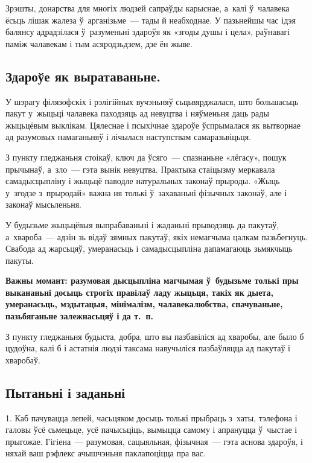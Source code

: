 
Зрэшты, донарства для многіх людзей сапраўды карыснае, а~калі ў~чалавека ёсьць лішак жалеза ў~арганізьме~--- тады й неабходнае. У пазьнейшы час ідэя балянсу адрадзілася ў~разуменьні здароўя як «згоды душы і цела», раўнавагі паміж чалавекам і тым асяродзьдзем, дзе ён жыве.

\subsection*{Здароўе як выратаваньне.} 

У шэрагу філязофскіх і рэлігійных вучэньняў сьцьвярджалася, што большасьць пакут у~жыцьці чалавека паходзяць ад невуцтва і няўменьня даць рады жыцьцёвым выклікам. Цялеснае і псыхічнае здароўе ўспрымалася як вытворнае ад разумовых намаганьняў і лічылася наступствам самаразьвіцьця.

З пункту гледжаньня стоікаў, ключ да ўсяго~--- спазнаньне «лёгасу», пошук прычынаў, а~зло~--- гэта вынік невуцтва. Практыка стаіцызму меркавала самадысцыпліну і жыцьцё паводле натуральных законаў прыроды. «Жыць у~згодзе з~прыродай» важна ня толькі ў~захаваньні фізычных законаў, але і законаў мысьленьня.

У будызьме жыцьцёвыя выпрабаваньні і жаданьні прыводзяць да пакутаў, а~хвароба~--- адзін зь відаў зямных пакутаў, якіх немагчыма цалкам пазьбегнуць. Свабода ад жарсьцяў, умеранасьць і самадысцыпліна дапамагаюць зьмякчыць пакуты.

\textbf{Важны момант: разумовая дысцыпліна магчымая ў~будызьме толькі пры выкананьні досыць строгіх правілаў ладу жыцьця, такіх як дыета, умеранасьць, мэдытацыя, мінімалізм, чалавекалюбства, спачуваньне, пазьбяганьне залежнасьцяў і да т.~п.} 

З пункту гледжаньня будыста, добра, што вы пазбавіліся ад хваробы, але было б цудоўна, калі б і астатнія людзі таксама навучыліся пазбаўляцца ад пакутаў і хваробаў.

\subsection*{Пытаньні і заданьні}

1. Каб пачувацца лепей, часьцяком досыць толькі прыбраць з~хаты, тэлефона і галовы ўсё сьмецьце, усё пачысьціць, вымыцца самому і апрануцца ў~чыстае і прыгожае. Гігіена~--- разумовая, сацыяльная, фізычная~--- гэта аснова здароўя, і няхай ваш рэфлекс ачышчэньня паклапоціцца пра вас.

